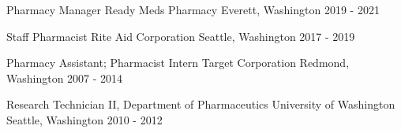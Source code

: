 

\begin{cventries}

  \cventry
    {Pharmacy Manager} %
    {Ready Meds Pharmacy} %
    {Everett, Washington} %
    {2019 - 2021} %
    {
    }

  \cventry
    {Staff Pharmacist} %
    {Rite Aid Corporation} %
    {Seattle, Washington} %
    {2017 - 2019} %
    {
    }

  \cventry
    {Pharmacy Assistant; Pharmacist Intern} %
    {Target Corporation} %
    {Redmond, Washington} %
    {2007 - 2014} %
    {
    }

  \cventry
    {Research Technician II, Department of Pharmaceutics} %
    {University of Washington} %
    {Seattle, Washington} %
    {2010 - 2012} %
    {
    }

\end{cventries}
